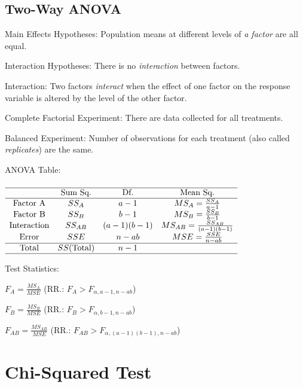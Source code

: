 \documentclass[%
 aip,
 jmp,%
 amsmath,amssymb,
 reprint,%
]{revtex4-1}
\begin{document}
\subsection{Two-Way ANOVA}
\begin{itemize}[label={}]
\item Main Effects Hypotheses: Population means at different levels of \textit{a factor} are all equal.
\item Interaction Hypotheses: There is no \textit{interaction} between factors.
\item Interaction: Two factors \textit{interact} when the effect of one factor on the response variable is altered by the level of the other factor.
{\small
\item Complete Factorial Experiment: There are data collected for all treatments.
\item Balanced Experiment: Number of observations for each treatment (also called \textit{replicates}) are the same.
}
\item ANOVA Table:\\\\
{\footnotesize
$\begin{array}{cccc}
\hline
 & \textrm{Sum Sq.} & \textrm{Df.} & \textrm{Mean Sq.} \\
\hline
\textrm{Factor A} & SS_A & a-1 & MS_A=\frac{SS_A}{a-1} \\
\textrm{Factor B} & SS_B & b-1 & MS_B=\frac{SS_B}{b-1} \\
\textrm{Interaction} & SS_{AB} & (a-1)(b-1) & MS_{AB}=\frac{SS_{AB}}{(a-1)(b-1)} \\
\textrm{Error} & SSE & n-ab & MSE=\frac{SSE}{n-ab} \\
\hline
\textrm{Total} & SS(\textrm{Total}) & n-1 \\
\hline
\end{array}$
}
\item Test Statistics: 
{\small
\item $F_A = \frac{MS_A}{MSE}$ (RR.: $F_A > F_{\alpha,a-1,n-ab}$)
\item $F_B = \frac{MS_B}{MSE}$ (RR.: $F_B > F_{\alpha,b-1,n-ab}$)
\item $F_{AB} = \frac{MS_{AB}}{MSE}$ (RR.: $F_{AB} > F_{\alpha,(a-1)(b-1),n-ab}$)
}
\end{itemize}

\section{Chi-Squared Test}
\end{document}
